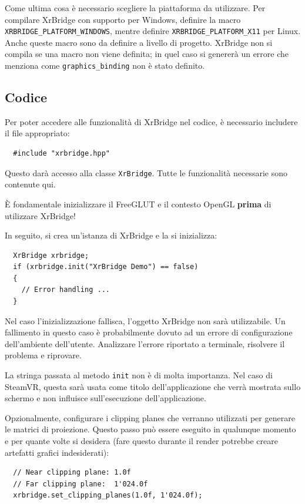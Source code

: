 \documentclass[twoside]{supsistudent}
\begin{document}
Come ultima cosa è necessario scegliere la piattaforma da utilizzare. Per compilare XrBridge con supporto per Windows, definire la macro \texttt{XRBRIDGE\_PLATFORM\_WINDOWS}, mentre definire \texttt{XRBRIDGE\_PLATFORM\_X11} per Linux. Anche queste macro sono da definire a livello di progetto. XrBridge non si compila se una macro non viene definita; in quel caso si genererà un errore che menziona come \texttt{graphics\_binding} non è stato definito.

\subsection{Codice}

Per poter accedere alle funzionalità di XrBridge nel codice, è necessario includere il file appropriato:

\begin{verbatim}
  #include "xrbridge.hpp"
\end{verbatim}

Questo darà accesso alla classe \texttt{XrBridge}. Tutte le funzionalità necessarie sono contenute qui.

È fondamentale inizializzare il FreeGLUT e il contesto OpenGL \textbf{prima} di utilizzare XrBridge!

In seguito, si crea un'istanza di XrBridge e la si inizializza:

\begin{verbatim}
  XrBridge xrbridge;
  if (xrbridge.init("XrBridge Demo") == false)
  {
    // Error handling ...
  }
\end{verbatim}

Nel caso l'inizializzazione fallisca, l'oggetto XrBridge non sarà utilizzabile. Un fallimento in questo caso è probabilmente dovuto ad un errore di configurazione dell'ambiente dell'utente. Analizzare l'errore riportato a terminale, risolvere il problema e riprovare.

La stringa passata al metodo \texttt{init} non è di molta importanza. Nel caso di SteamVR, questa sarà usata come titolo dell'applicazione che verrà mostrata sullo schermo e non influisce sull'esecuzione dell'applicazione.

Opzionalmente, configurare i clipping planes che verranno utilizzati per generare le matrici di proiezione. Questo passo può essere eseguito in qualunque momento e per quante volte si desidera (fare questo durante il render potrebbe creare artefatti grafici indesiderati):

\begin{verbatim}
  // Near clipping plane: 1.0f
  // Far clipping plane:  1'024.0f
  xrbridge.set_clipping_planes(1.0f, 1'024.0f);
\end{verbatim}
\end{document}
